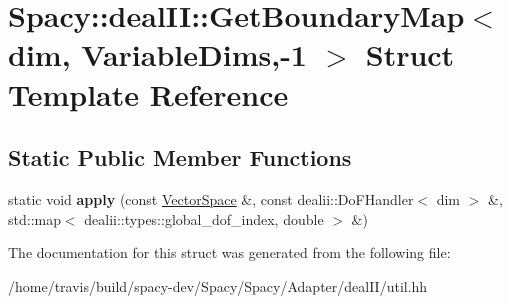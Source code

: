 \hypertarget{structSpacy_1_1dealII_1_1GetBoundaryMap_3_01dim_00_01VariableDims_00-1_01_4}{\section{Spacy\-:\-:deal\-I\-I\-:\-:Get\-Boundary\-Map$<$ dim, Variable\-Dims,-\/1 $>$ Struct Template Reference}
\label{structSpacy_1_1dealII_1_1GetBoundaryMap_3_01dim_00_01VariableDims_00-1_01_4}
}
\subsection*{Static Public Member Functions}
\begin{DoxyCompactItemize}
\item 
\hypertarget{structSpacy_1_1dealII_1_1GetBoundaryMap_3_01dim_00_01VariableDims_00-1_01_4_a446e81cfd556dbf1a7621774783e8364}{static void {\bfseries apply} (const \hyperlink{classSpacy_1_1VectorSpace}{Vector\-Space} \&, const dealii\-::\-Do\-F\-Handler$<$ dim $>$ \&, std\-::map$<$ dealii\-::types\-::global\-\_\-dof\-\_\-index, double $>$ \&)}\label{structSpacy_1_1dealII_1_1GetBoundaryMap_3_01dim_00_01VariableDims_00-1_01_4_a446e81cfd556dbf1a7621774783e8364}

\end{DoxyCompactItemize}


The documentation for this struct was generated from the following file\-:\begin{DoxyCompactItemize}
\item 
/home/travis/build/spacy-\/dev/\-Spacy/\-Spacy/\-Adapter/deal\-I\-I/util.\-hh\end{DoxyCompactItemize}
